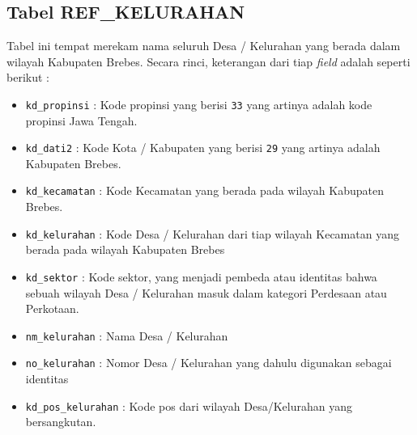 \subsection{Tabel REF\_KELURAHAN}

Tabel ini tempat merekam nama seluruh Desa / Kelurahan yang berada dalam wilayah Kabupaten Brebes. Secara rinci, keterangan dari tiap \textit{field} adalah seperti berikut :

\begin{itemize}
	\item \texttt{kd\_propinsi} : Kode propinsi yang berisi \texttt{33} yang artinya adalah kode propinsi Jawa Tengah.
	\item \texttt{kd\_dati2} : Kode Kota / Kabupaten yang berisi \texttt{29} yang artinya adalah Kabupaten Brebes.
	\item \texttt{kd\_kecamatan} : Kode Kecamatan yang berada pada wilayah Kabupaten Brebes.
	\item \texttt{kd\_kelurahan} : Kode Desa / Kelurahan dari tiap wilayah Kecamatan yang berada pada wilayah Kabupaten Brebes
	\item \texttt{kd\_sektor} : Kode sektor, yang menjadi pembeda atau identitas bahwa sebuah wilayah Desa / Kelurahan masuk dalam kategori Perdesaan atau Perkotaan.
	\item \texttt{nm\_kelurahan} : Nama Desa / Kelurahan
	\item \texttt{no\_kelurahan} : Nomor Desa / Kelurahan yang dahulu digunakan sebagai identitas 
	\item \texttt{kd\_pos\_kelurahan} : Kode pos dari wilayah Desa/Kelurahan yang bersangkutan.
\end{itemize}